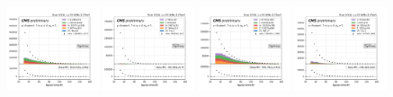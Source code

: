 \begin{figure}
    \centering
    \includegraphics[width=0.24\textwidth]{appendices/qcdSF/figures/123j1b/mu_leptonOnePt_True.png}
    \includegraphics[width=0.24\textwidth]{appendices/qcdSF/figures/123j1b/mu_leptonOnePt_False.png}
    \includegraphics[width=0.24\textwidth]{appendices/qcdSF/figures/123j1b/e_leptonOnePt_True.png}
    \includegraphics[width=0.24\textwidth]{appendices/qcdSF/figures/123j1b/e_leptonOnePt_False.png}
    

\end{figure}
